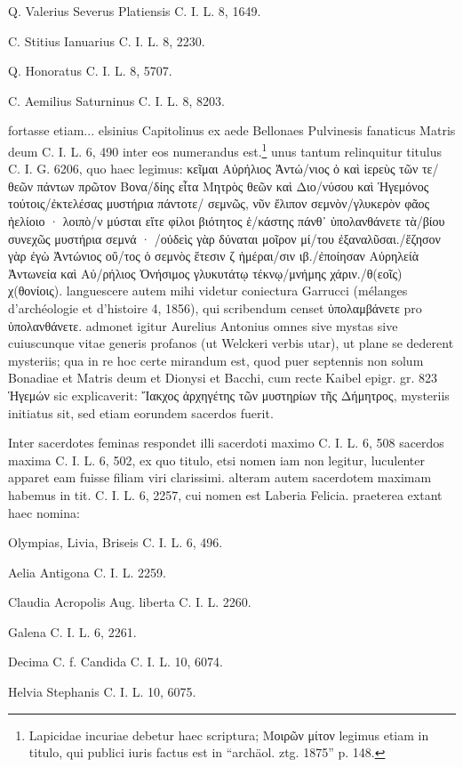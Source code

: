 \documentclass[a4paper, 11pt, oneside, polutonikogreek, german]{article}
\begin{document}
Q. Valerius Severus Platiensis C. I. L. 8, 1649.

C. Stitius Ianuarius C. I. L. 8, 2230.

Q. Honoratus C. I. L. 8, 5707.

C. Aemilius Saturninus C. I. L. 8, 8203.

fortasse etiam... elsinius Capitolinus ex aede Bellonaes Pulvinesis fanaticus Matris deum C. I. L. 6, 490 inter eos numerandus est.\footnote{Lapicidae incuriae debetur haec scriptura; Μοιρῶν μίτον legimus etiam in titulo, qui publici iuris factus est in "`archäol. ztg. 1875"' p. 148.} unus tantum relinquitur titulus C. I. G. 6206, quo haec legimus: κεῖμαι Αὐρήλιος Ἀντώ/νιος ὁ καὶ ἱερεὺς τῶν τε/θεῶν πάντων πρῶτον Βονα/δίης εἶτα Μητρὸς θεῶν καὶ Διο/νύσου καὶ Ἡγεμόνος τούτοις/ἐκτελέσας μυστήρια πάντοτε/ σεμνῶς, νῦν ἔλιπον σεμνὸν/γλυκερὸν φᾶος ἠελίοιο · λοιπὸ/ν μύσται εἴτε φίλοι βιότητος ἑ/κάστης πάνθ᾽ ὑπολανθάνετε τὰ/βίου συνεχῶς μυστήρια σεμνά · /οὐδεὶς γὰρ δύναται μοῖρον μί/του ἐξαναλῦσαι./ἕζησον γὰρ ἐγὼ Ἀντώνιος οὔ/τος ὁ σεμνὸς ἕτεσιν ζ ἡμέραι/σιν ιβ./ἐποίησαν Αὐρηλείὰ Ἀντωνεία καὶ Αὐ/ρήλιος Ὀνήσιμος γλυκυτάτῳ τέκνῳ/μνήμης χάριν./θ(εοῖς) χ(θονίοις). languescere autem mihi videtur coniectura Garrucci (mélanges d'archéologie et d'histoire 4, 1856), qui scribendum censet ὑπολαμβάνετε pro ὑπολανθάνετε. admonet igitur Aurelius Antonius omnes sive mystas sive cuiuscunque vitae generis profanos (ut Welckeri verbis utar), ut plane se dederent mysteriis; qua in re hoc certe mirandum est, quod puer septennis non solum Bonadiae et Matris deum et Dionysi et Bacchi, cum recte Kaibel epigr. gr. 823 Ἡγεμών sic explicaverit: Ἴακχος ἀρχηγέτης τῶν μυστηρίων τῆς Δήμητρος, mysteriis initiatus sit, sed etiam eorundem sacerdos fuerit.

Inter sacerdotes feminas respondet illi sacerdoti maximo C. I. L. 6, 508 sacerdos maxima C. I. L. 6, 502, ex quo titulo, etsi nomen iam non legitur, luculenter apparet eam fuisse filiam viri clarissimi. alteram autem sacerdotem maximam habemus in tit. C. I. L. 6, 2257, cui nomen est Laberia Felicia. praeterea extant haec nomina:

Olympias, Livia, Briseis C. I. L. 6, 496.

Aelia Antigona C. I. L. 2259.

Claudia Acropolis Aug. liberta C. I. L. 2260.

Galena C. I. L. 6, 2261.

Decima C. f. Candida C. I. L. 10, 6074.

Helvia Stephanis C. I. L. 10, 6075.
\end{document}
